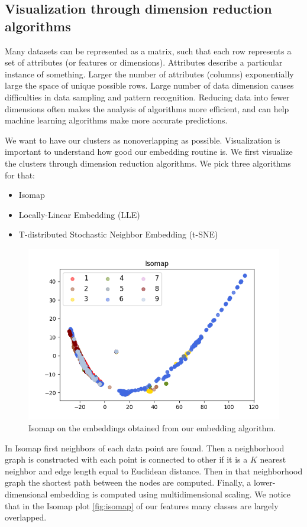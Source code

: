 \documentclass[oneside, twocolumn, a4paper, 10pt]{IEEEtran}
\begin{document}
\subsection{Visualization through dimension reduction algorithms}
Many datasets can be represented as a matrix, such that each row represents a set of attributes (or features or dimensions). Attributes describe a particular instance of something. Larger the number of attributes (columns) exponentially large the space of unique possible rows. Large number of data dimension causes difficulties in data sampling and pattern recognition. Reducing data into fewer dimensions often makes the analysis of algorithms more efficient, and can help machine learning algorithms make more accurate predictions.\\
\par
We want to have our clusters as nonoverlapping as possible. Visualization is important to understand how good our embedding routine is. We first visualize the clusters through dimension reduction algorithms. We pick three algorithms for that:
\begin{itemize}
\item Isomap
\item Locally-Linear Embedding (LLE)
\item T-distributed Stochastic Neighbor Embedding (t-SNE)
\end{itemize}
\begin{figure}
\centering
\includegraphics[width=0.6\linewidth]{../data/visualization/Isomap.png}
\caption{Isomap on the embeddings obtained from our embedding algorithm.}
\label{fig:isomap}
\end{figure}
In Isomap first neighbors of each data point are found. Then a neighborhood graph is constructed with each point is connected to other if it is a $K$ nearest neighbor and edge length equal to Euclidean distance. Then in that neighborhood graph the shortest path between the nodes are computed. Finally, a lower-dimensional embedding is computed using multidimensional scaling. We notice that in the Isomap plot \autoref{fig:isomap} of our features many classes are largely overlapped.\\
\end{document}

